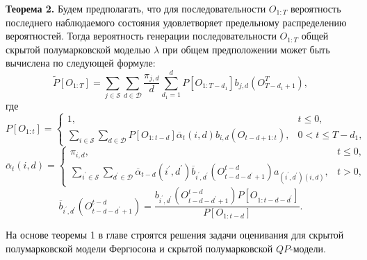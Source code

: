 \documentclass[twoside,12pt]{article}
\begin{document}
\textbf{Теорема 2.}
Будем предполагать, что для последовательности $O_{1:T}$ вероятность последнего наблюдаемого состояния удовлетворяет предельному распределению вероятностей.
 Тогда вероятность генерации последовательности $O_{1:T}$ общей скрытой полумарковской моделью $\lambda$ при общем предположении может быть вычислена по следующей формуле:
\begin{equation}\label{eq:chapt3_gsmm:theorem2:1}
\widetilde{P}[O_{1:T}]=\sum\limits_{j\in \mathcal{S}}\sum\limits_{d \in \mathcal{D}}\frac{\pi_{j,d}}{d}\sum\limits_{d_1=1}^{d}P[O_{1:T-d_1}]b_{j,d}(O_{T-d_1+1}^{T}),
\end{equation}
где
\begin{equation}\label{eq:chapt3_gsmm:theorem2:2}
P[O_{1:t}]=\left\{\begin{array}{ll}
1, &t\leq 0,\\\sum\limits_{i\in \mathcal{S}}\sum\limits_{d\in \mathcal{D}}P[O_{1:t-d}]\overline{\alpha}_{t}(i,d)b_{i,d}(O_{t-d+1:t}),& 0<t\leq T-d_1,\end{array}\right.
\end{equation}
\begin{equation}\label{eq:chapt3_gsmm:theorem2:3}
\overline{\alpha}_{t}(i,d)=\left\{
\begin{array}{ll}
\pi_{i,d}, &t\leq 0,\\
\sum\limits_{i^\prime\in \mathcal{S}}\sum\limits_{d^\prime \in \mathcal{D}}\overline{\alpha}_{t-d}(i^\prime,d^\prime)\overline{b}_{i^\prime,d^\prime}(O_{t-d-d^\prime+1}^{t-d})
a_{(i^\prime, d^\prime)(i,d)}, & t>0,
\end{array}\right.
\end{equation}
\begin{equation}
\nonumber
\overline{b}_{i^\prime,d^\prime}(O_{t-d-d^\prime+1}^{t-d})=\frac{b_{i^\prime,d^\prime}(O_{t-d-d^\prime+1}^{t-d})P[O_{1:t-d-d^\prime}]}{P[O_{1:t-d}]}.
\end{equation}

На основе теоремы 1 в главе строятся решения задачи оценивания для скрытой полумарковской модели Фергюсона и скрытой полумарковской $QP$-модели.
\end{document}
